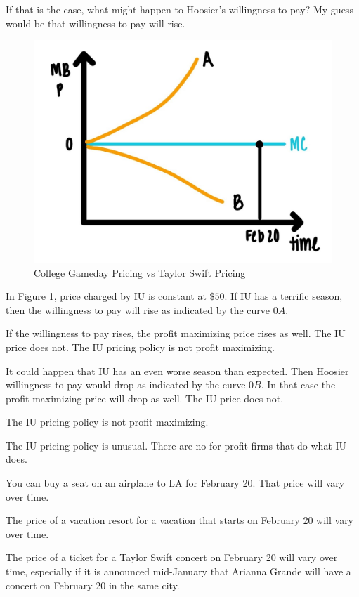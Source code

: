 \documentclass[
]{book}
\begin{document}
If that is the case, what might happen to Hoosier's willingness to pay? My guess would be that willingness to pay will rise.

\begin{figure}

{\centering \includegraphics[width=0.75\linewidth]{img/monopoly/fig11} 

}

\caption{College Gameday Pricing vs Taylor Swift Pricing}\label{fig:monopoly11}
\end{figure}

In Figure \ref{fig:monopoly11}, price charged by IU is constant at \(\$50\). If IU has a terrific season, then the willingness to pay will rise as indicated by the curve \(0A\).

If the willingness to pay rises, the profit maximizing price rises as well. The IU price does not. The IU pricing policy is not profit maximizing.

It could happen that IU has an even worse season than expected. Then Hoosier willingness to pay would drop as indicated by the curve \(0B\). In that case the profit maximizing price will drop as well. The IU price does not.

The IU pricing policy is not profit maximizing.

The IU pricing policy is unusual. There are no for-profit firms that do what IU does.

You can buy a seat on an airplane to LA for February 20. That price will vary over time.

The price of a vacation resort for a vacation that starts on February 20 will vary over time.

The price of a ticket for a Taylor Swift concert on February 20 will vary over time, especially if it is announced mid-January that Arianna Grande will have a concert on February 20 in the same city.
\end{document}
